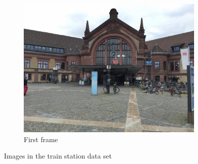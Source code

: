 \begin{figure}[h]
\begin{subfigure}{.33\textwidth}
      \includegraphics[width=\textwidth]{gfx/bahnhof_imgs/1.JPG}
      \caption{First frame}
   \end{subfigure}
   \caption[Train station images]{Images in the train station data set}
   \label{fig:train_imgs}
\end{figure}
\FloatBarrier

\newpage
